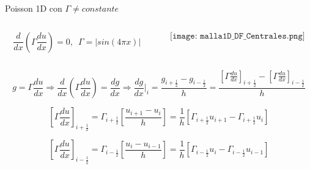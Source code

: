 \documentclass[handout]{beamer}
\begin{document}
\begin{frame}{Poisson 1D con $\Gamma \neq constante$}
	
{\small 

\begin{columns}
	
\begin{column}{0.5\textwidth}
	\begin{displaymath}
	\dfrac{d}{d x} \left(\Gamma \dfrac{d u}{d x} \right) = 0, \,\,\, \Gamma = |sin(4 \pi x)|
	\end{displaymath}
\end{column}
\begin{column}{0.5\textwidth}
	$$\texttt{[image: malla1D\_DF\_Centrales.png]}$$
\end{column}

\end{columns}

\pause

\begin{displaymath}
g = \Gamma \dfrac{d u}{d x} \Longrightarrow \dfrac{d}{d x} \left(\Gamma \dfrac{d u}{d x} \right) = \dfrac{d g}{d x} 
\Longrightarrow
\dfrac{d g}{d x} \Big|_{i} = \dfrac{g_{i+\frac{1}{2}} - g_{i-\frac{1}{2}}}{h} =
\dfrac{\left[\Gamma \frac{du}{dx}\right]_{i+\frac{1}{2}} - \left[\Gamma \frac{du}{dx}\right]_{i-\frac{1}{2}}}{h}
\end{displaymath}

\pause

\begin{displaymath}
\left[\Gamma \frac{du}{dx}\right]_{i+\frac{1}{2}} = 
\Gamma_{i+\frac{1}{2}} \left[\dfrac{u_{i+1}-u_{i}}{h}\right] =
\dfrac{1}{h}\left[\Gamma_{i+\frac{1}{2}} u_{i+1} - \Gamma_{i+\frac{1}{2}} u_{i}\right]
\end{displaymath}

\begin{displaymath}
\left[\Gamma \frac{du}{dx}\right]_{i-\frac{1}{2}} = 
\Gamma_{i-\frac{1}{2}} \left[\dfrac{u_{i}-u_{i-1}}{h}\right] =
\dfrac{1}{h}\left[\Gamma_{i-\frac{1}{2}} u_{i} - \Gamma_{i-\frac{1}{2}} u_{i-1}\right]
\end{displaymath}
}

\end{frame}
\end{document}

